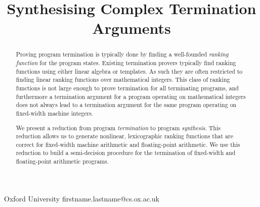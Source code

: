 \documentclass[preprint]{sigplanconf}
\theoremstyle{definition}
\begin{document}
\setlength{\pdfpageheight}{\paperheight}
\setlength{\pdfpagewidth}{\paperwidth}





\title{Synthesising Complex Termination Arguments}

           {Oxford University}
           {firstname.lastname@cs.ox.ac.uk}

\maketitle

\begin{abstract}
Proving program termination is typically done by finding a well-founded \emph{ranking function}
for the program states.
Existing termination provers typically find ranking functions
using either linear algebra or templates.  As such they are often restricted to
finding linear ranking functions over mathematical integers.  This class
of ranking functions is not large enough to prove termination for all terminating
programs, and furthermore a termination argument for a program operating on mathematical integers
does not always lead to a termination argument for the same program operating on
fixed-width machine integers.

We present a reduction from program \emph{termination} to program \emph{synthesis}.
This reduction allows us to generate nonlinear, lexicographic ranking functions that
are correct for fixed-width machine arithmetic and floating-point arithmetic.
We use this reduction to build a semi-decision procedure for the termination
of fixed-width and floating-point arithmetic programs.
\end{abstract}

\end{document}
